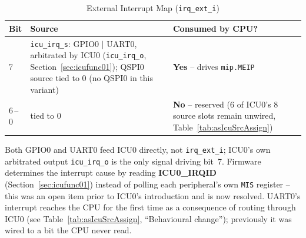 \begin{table}[H]
\caption{External Interrupt Map (\texttt{irq\_ext\_i})}
\label{tab:irqmap}
\centering
{\footnotesize
\begin{tabularx}{\textwidth}{|l |X |X|}
  \hline
  Bit & Source & Consumed by CPU? \\
  \hline
  \hline
  7 & \texttt{icu\_irq\_s}: GPIO0 $\vert$ UART0, arbitrated by ICU0
    (\texttt{icu\_irq\_o}, Section~\ref{sec:icufunc01}); QSPI0 source tied
    to 0 (no QSPI0 in this variant) &
    \textbf{Yes} -- drives \texttt{mip.MEIP} \\
  \hline
  6\,--\,0 & tied to 0 &
    \textbf{No} -- reserved (6 of ICU0's 8 source slots remain
    unwired, Table~\ref{tab:asIcuSrcAssign}) \\
  \hline
\end{tabularx}}
\end{table}

Both GPIO0 and UART0 feed
ICU0 directly, not \texttt{irq\_ext\_i}; ICU0's own arbitrated output
\texttt{icu\_irq\_o} is the only signal driving bit~7. Firmware
determines the interrupt cause by reading \textbf{ICU0\_IRQID}
(Section~\ref{sec:icufunc01}) instead of polling each peripheral's own
\texttt{MIS} register -- this was an open item prior to ICU0's
introduction and is now resolved.
UART0's interrupt reaches the CPU for the
first time as a consequence of routing through ICU0 (see
Table~\ref{tab:asIcuSrcAssign}, ``Behavioural change''); previously it was wired to a bit the CPU never
read.
